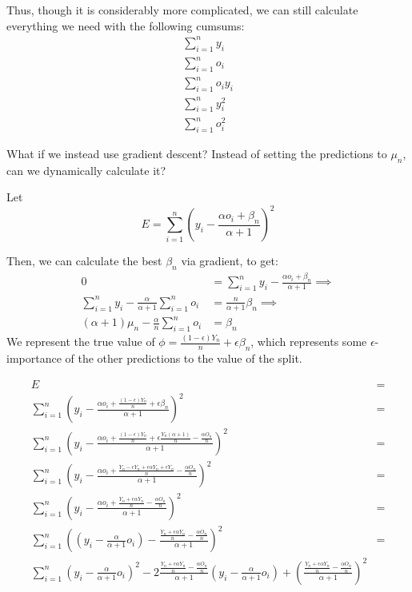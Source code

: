 \documentclass{article}
\begin{document}
Thus, though it is considerably more complicated, we can still calculate everything we need with the following cumsums:
\begin{align*}
    \sum_{i=1}^{n} y_i \\
    \sum_{i=1}^{n} o_i \\
    \sum_{i=1}^{n} o_i y_i \\
    \sum_{i=1}^{n} y_i^2 \\
    \sum_{i=1}^{n} o_i^2 
\end{align*}

What if we instead use gradient descent? Instead of setting the predictions to $\mu_n$, 
can we dynamically calculate it?

Let \[
E = \sum_{i=1}^n (y_i - \frac{\alpha o_i + \beta_n}{\alpha + 1})^2 
\]   

Then, we can calculate the best $\beta_n$ via gradient, to get:
\begin{align*}
    0 &= \sum_{i=1}^n y_i - \frac{\alpha o_i + \beta_n}{\alpha + 1} \implies \\
    \sum_{i=1}^n y_i - \frac{\alpha}{\alpha + 1} \sum_{i=1}^{n} o_i &= \frac{n}{\alpha + 1}\beta_n  \implies \\
    (\alpha + 1)\mu_n - \frac{\alpha}{n} \sum_{i=1}^{n} o_i &= \beta_n
\end{align*}
We represent the true value of $\phi = \frac{(1 - \epsilon)Y_n}{n} + \epsilon \beta_n$, which represents some $\epsilon$-importance of the 
other predictions to the value of the split.

\begin{align*}
    E &= \\
    \sum_{i=1}^n \left(y_i - \frac{\alpha o_i + \frac{(1 - \epsilon)Y_n}{n} + \epsilon \beta_n}{\alpha + 1} \right)^2 &= \\
    \sum_{i=1}^n \left(y_i - \frac{\alpha o_i + \frac{(1 - \epsilon)Y_n}{n} + \epsilon \frac{Y_n(\alpha + 1)}{n} - \frac{\alpha O_n}{n}}{\alpha + 1} \right)^2 &= \\
    \sum_{i=1}^n \left(y_i - \frac{\alpha o_i + \frac{Y_n - \epsilon Y_n + \epsilon \alpha Y_n + \epsilon Y_n}{n} - \frac{\alpha O_n}{n}}{\alpha + 1} \right)^2 &= \\
    \sum_{i=1}^n \left(y_i - \frac{\alpha o_i + \frac{Y_n + \epsilon \alpha Y_n}{n} - \frac{\alpha O_n}{n}}{\alpha + 1} \right)^2 &= \\
    \sum_{i=1}^n \left(\left(y_i - \frac{\alpha}{\alpha + 1}o_i\right) - \frac{\frac{Y_n + \epsilon \alpha Y_n}{n} - \frac{\alpha O_n}{n}}{\alpha + 1} \right)^2 &= \\
    \sum_{i=1}^n \left(y_i - \frac{\alpha}{\alpha + 1}o_i\right)^2 - 2\frac{\frac{Y_n + \epsilon \alpha Y_n}{n} - \frac{\alpha O_n}{n}}{\alpha + 1}\left(y_i - \frac{\alpha}{\alpha + 1}o_i\right) + \left( \frac{\frac{Y_n + \epsilon \alpha Y_n}{n} - \frac{\alpha O_n}{n}}{\alpha + 1}\right)^2
\end{align*}
\end{document}
